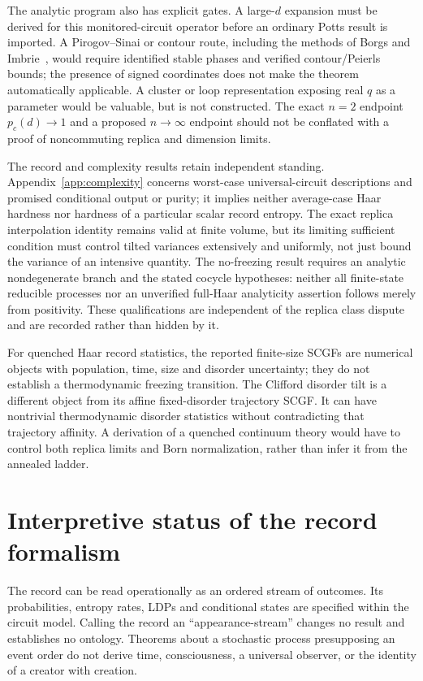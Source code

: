 The analytic program also has explicit gates. A large-$d$ expansion must be derived for this monitored-circuit operator before an ordinary Potts result is imported. A Pirogov--Sinai or contour route, including the methods of Borgs and Imbrie~\cite{BorgsImbrie1989}, would require identified stable phases and verified contour/Peierls bounds; the presence of signed coordinates does not make the theorem automatically applicable. A cluster or loop representation exposing real $q$ as a parameter would be valuable, but is not constructed. The exact $n=2$ endpoint $p_c(d)\to1$ and a proposed $n\to\infty$ endpoint should not be conflated with a proof of noncommuting replica and dimension limits.

The record and complexity results retain independent standing. Appendix~\ref{app:complexity} concerns worst-case universal-circuit descriptions and promised conditional output or purity; it implies neither average-case Haar hardness nor hardness of a particular scalar record entropy. The exact replica interpolation identity remains valid at finite volume, but its limiting sufficient condition must control tilted variances extensively and uniformly, not just bound the variance of an intensive quantity. The no-freezing result requires an analytic nondegenerate branch and the stated cocycle hypotheses: neither all finite-state reducible processes nor an unverified full-Haar analyticity assertion follows merely from positivity. These qualifications are independent of the replica class dispute and are recorded rather than hidden by it.

For quenched Haar record statistics, the reported finite-size SCGFs are numerical objects with population, time, size and disorder uncertainty; they do not establish a thermodynamic freezing transition. The Clifford disorder tilt is a different object from its affine fixed-disorder trajectory SCGF. It can have nontrivial thermodynamic disorder statistics without contradicting that trajectory affinity. A derivation of a quenched continuum theory would have to control both replica limits and Born normalization, rather than infer it from the annealed ladder.

\section{Interpretive status of the record formalism}
\label{sec:interpretation}

The record can be read operationally as an ordered stream of outcomes. Its probabilities, entropy rates, LDPs and conditional states are specified within the circuit model. Calling the record an ``appearance-stream'' changes no result and establishes no ontology. Theorems about a stochastic process presupposing an event order do not derive time, consciousness, a universal observer, or the identity of a creator with creation.

